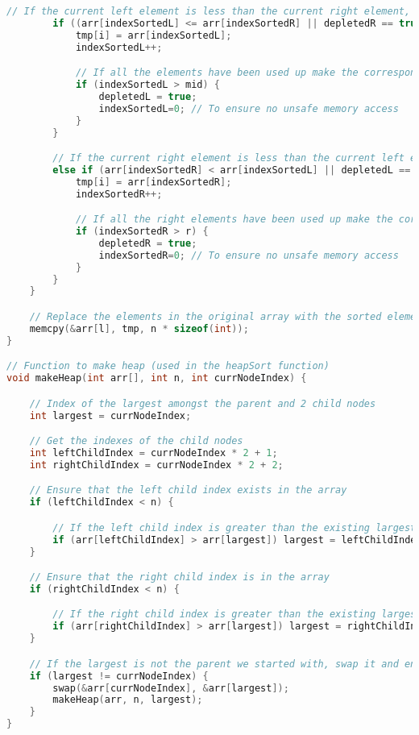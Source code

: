 \documentclass[12pt]{article}
\begin{document}
\begin{lstlisting}[language=c]
		// If the current left element is less than the current right element, or if the right array has been used up, go ahead and insert into tmp
		if ((arr[indexSortedL] <= arr[indexSortedR] || depletedR == true) && !depletedL) {
			tmp[i] = arr[indexSortedL];
			indexSortedL++;

			// If all the elements have been used up make the corresponding boolean true
			if (indexSortedL > mid) {
				depletedL = true;
				indexSortedL=0; // To ensure no unsafe memory access
			}	
		}

		// If the current right element is less than the current left element, or if the left half has been used up, insert the right element into tmp
		else if (arr[indexSortedR] < arr[indexSortedL] || depletedL == true) {
			tmp[i] = arr[indexSortedR];
			indexSortedR++;

			// If all the right elements have been used up make the corresponding boolean true
			if (indexSortedR > r) {
				depletedR = true;
				indexSortedR=0; // To ensure no unsafe memory access
			}
		}
	}

	// Replace the elements in the original array with the sorted elements in the same range
	memcpy(&arr[l], tmp, n * sizeof(int));
}

// Function to make heap (used in the heapSort function)
void makeHeap(int arr[], int n, int currNodeIndex) {

	// Index of the largest amongst the parent and 2 child nodes
	int largest = currNodeIndex;

	// Get the indexes of the child nodes
	int leftChildIndex = currNodeIndex * 2 + 1;
	int rightChildIndex = currNodeIndex * 2 + 2;

	// Ensure that the left child index exists in the array
	if (leftChildIndex < n) {

		// If the left child index is greater than the existing largest (parent) assign it as the largest
		if (arr[leftChildIndex] > arr[largest]) largest = leftChildIndex;
	}

	// Ensure that the right child index is in the array
	if (rightChildIndex < n) {

		// If the right child index is greater than the existing largest (parent or left child) assign it as the largest
		if (arr[rightChildIndex] > arr[largest]) largest = rightChildIndex;
	}

	// If the largest is not the parent we started with, swap it and ensure the subheap that was swapped is still a heap
	if (largest != currNodeIndex) {
		swap(&arr[currNodeIndex], &arr[largest]);
		makeHeap(arr, n, largest);
	}
}


\end{lstlisting}
\end{document}
